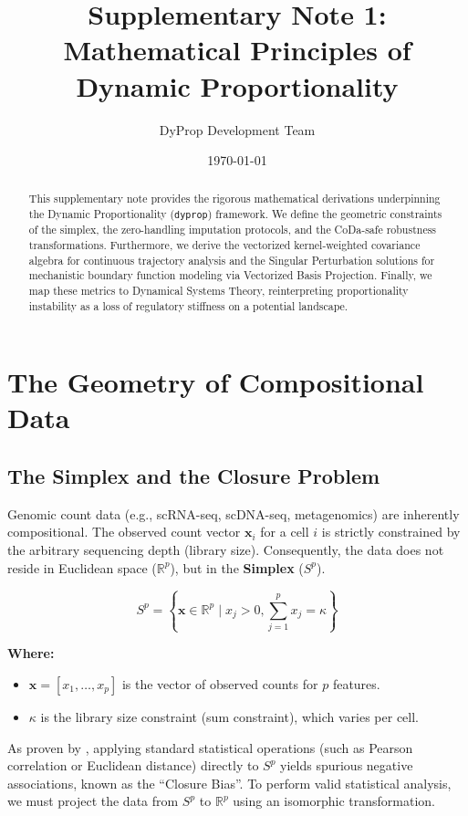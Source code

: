 \documentclass[11pt, a4paper]{article}
\title{\textbf{Supplementary Note 1: Mathematical Principles of Dynamic Proportionality}}
\author{DyProp Development Team}
\date{\today}
\begin{document}
\maketitle

\begin{abstract}
This supplementary note provides the rigorous mathematical derivations underpinning the Dynamic Proportionality (\texttt{dyprop}) framework. We define the geometric constraints of the simplex, the zero-handling imputation protocols, and the CoDa-safe robustness transformations. Furthermore, we derive the vectorized kernel-weighted covariance algebra for continuous trajectory analysis and the Singular Perturbation solutions for mechanistic boundary function modeling via Vectorized Basis Projection. Finally, we map these metrics to Dynamical Systems Theory, reinterpreting proportionality instability as a loss of regulatory stiffness on a potential landscape.
\end{abstract}

\section{The Geometry of Compositional Data}

\subsection{The Simplex and the Closure Problem}
Genomic count data (e.g., scRNA-seq, scDNA-seq, metagenomics) are inherently compositional. The observed count vector $\mathbf{x}_i$ for a cell $i$ is strictly constrained by the arbitrary sequencing depth (library size). Consequently, the data does not reside in Euclidean space ($\mathbb{R}^p$), but in the \textbf{Simplex} ($S^p$).

\begin{equation}
S^p = \left\{ \mathbf{x} \in \mathbb{R}^p \mid x_j > 0, \sum_{j=1}^p x_j = \kappa \right\}
\end{equation}

\noindent\textbf{Where:}
\begin{itemize}
    \item $\mathbf{x} = [x_1, \dots, x_p]$ is the vector of observed counts for $p$ features.
    \item $\kappa$ is the library size constraint (sum constraint), which varies per cell.
\end{itemize}

As proven by \citet{aitchison1986}, applying standard statistical operations (such as Pearson correlation or Euclidean distance) directly to $S^p$ yields spurious negative associations, known as the ``Closure Bias''. To perform valid statistical analysis, we must project the data from $S^p$ to $\mathbb{R}^p$ using an isomorphic transformation.
\end{document}
